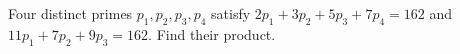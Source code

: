 Four distinct primes $p_1,p_2,p_3,p_4$ satisfy $2p_1+3p_2+5p_3+7p_4=162$ and $11p_1+7p_2+9p_3=162$. Find their product.
